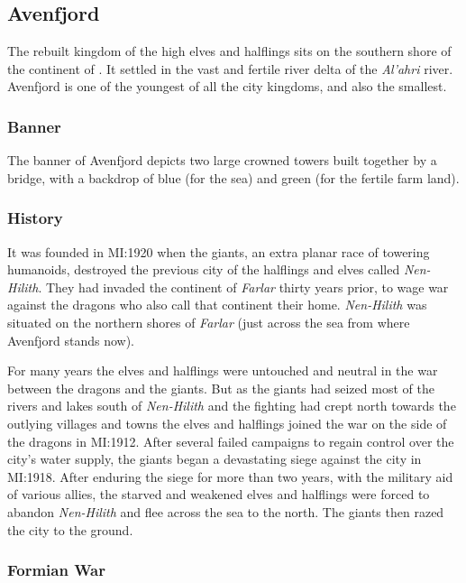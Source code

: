 \subsection{Avenfjord}
\label{sec:Avenfjord}

The rebuilt kingdom of the high elves and halflings sits on the southern shore
of the continent of . It settled in the vast and fertile
river delta of the \emph{Al'ahri} river. Avenfjord is one of the youngest of
all the city kingdoms, and also the smallest.

\subsubsection{Banner}

The banner of Avenfjord depicts two large crowned towers built together by
a bridge, with a backdrop of blue (for the sea) and green (for the fertile
farm land).

\subsubsection{History}
\label{sec:Nen-Hilith}

It was founded in MI:1920 when the giants, an extra planar race of towering
humanoids, destroyed the previous city of the halflings and elves called
\emph{Nen-Hilith}. They had invaded the continent of \emph{Farlar} thirty
years prior, to wage war against the dragons who also call that continent
their home. \emph{Nen-Hilith} was situated on the northern shores of
\emph{Farlar} (just across the sea from where Avenfjord stands now).

For many years the elves and halflings were untouched and neutral in the
war between the dragons and the giants. But as the giants had seized most of
the rivers and lakes south of \emph{Nen-Hilith} and the fighting had crept
north towards the outlying villages and towns the elves and halflings joined
the war on the side of the dragons in MI:1912. After several failed campaigns
to regain control over the city's water supply, the giants began a devastating
siege against the city in MI:1918. After enduring the siege for more than two
years, with the military aid of various allies, the starved and weakened elves
and halflings were forced to abandon \emph{Nen-Hilith} and flee across the sea
to the north. The giants then razed the city to the ground.

\subsubsection{Formian War}
\label{sec:Formian War}

